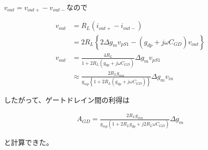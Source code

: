 \documentclass[twocolumn]{jsarticle}
\begin{document}
                \newpage
                
                $v_{out}=v_{out+}-v_{out-}$なので

                \begin{align*}
                    v_{out} &= R_{L}(i_{out+}-i_{out-})  \\
                    &= 2R_{L} \left\{ 2\Delta g_{m}v_{pS1}-(g_{dp}+j\omega C_{GD})v_{out} \right\} \\
                    v_{out} &= \frac{4R_{L}}{1+2R_{L}(g_{dp}+j\omega C_{GD})}\Delta g_{m}v_{pS1}    \\
                    &\approx \frac{2R_{L}g_{mn}}{g_{mp} \left\{ 1+2R_{L}(g_{dp}+j\omega C_{GD}) \right\} }\Delta g_{m}v_{in}
                \end{align*}

                したがって、ゲートドレイン間の利得は

                \begin{align*}
                    A_{GD}=\frac{2R_{L}g_{mn} }{ g_{mp}(1+2R_{L}g_{dp} + j2R_{L}\omega C_{GD}) }\Delta g_{m}    \tag{9}
                \end{align*}

                と計算できた。
\end{document}
